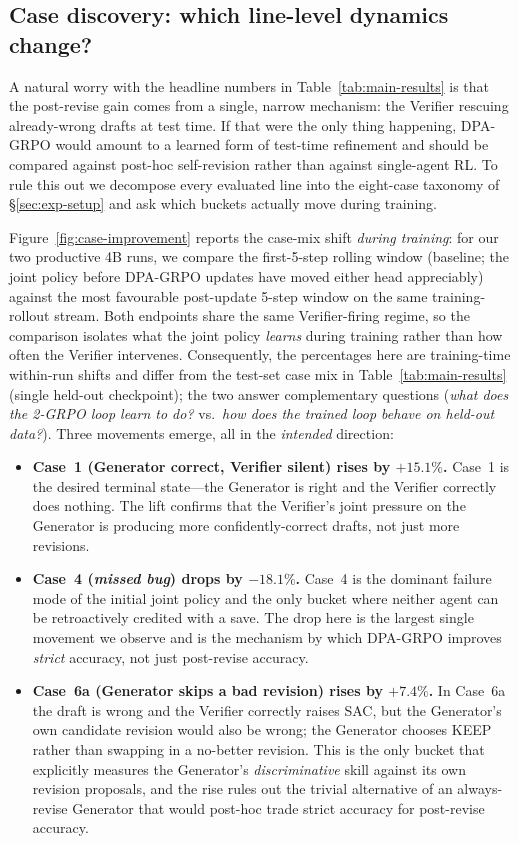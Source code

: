 \subsection{Case discovery: which line-level dynamics change?}
\label{sec:exp-cases}

A natural worry with the headline numbers in
Table~\ref{tab:main-results} is that the post-revise gain comes from a
single, narrow mechanism: the Verifier rescuing already-wrong drafts at
test time. If that were the only thing happening, DPA-GRPO would amount
to a learned form of test-time refinement and should be compared
against post-hoc self-revision rather than against single-agent RL. To
rule this out we decompose every evaluated line into the eight-case
taxonomy of \S\ref{sec:exp-setup} and ask which buckets actually move
during training.

Figure~\ref{fig:case-improvement} reports the case-mix shift
\emph{during training}: for our two productive 4B runs, we compare the
first-5-step rolling window (baseline; the joint policy before
DPA-GRPO updates have moved either head appreciably) against the most
favourable post-update 5-step window on the same training-rollout
stream. Both endpoints share the same Verifier-firing regime, so the
comparison isolates what the joint policy \emph{learns} during training
rather than how often the Verifier intervenes. Consequently, the
percentages here are training-time within-run shifts and differ from
the test-set case mix in Table~\ref{tab:main-results} (single held-out
checkpoint); the two answer complementary questions
(\emph{what does the 2-GRPO loop learn to do?} vs.\ \emph{how does the
trained loop behave on held-out data?}). Three movements emerge, all
in the \emph{intended} direction:

\begin{itemize}
\item \textbf{Case~1 (Generator correct, Verifier silent) rises by
  $+15.1\%$.} Case~1 is the desired terminal state---the Generator
  is right and the Verifier correctly does nothing. The lift confirms
  that the Verifier's joint pressure on the Generator is producing
  more confidently-correct drafts, not just more revisions.
\item \textbf{Case~4 (\emph{missed bug}) drops by $-18.1\%$.} Case~4
  is the dominant failure mode of the initial joint policy and the only
  bucket where neither agent can be retroactively credited with a save.
  The drop here is the largest single movement we observe and is the
  mechanism by which DPA-GRPO improves \emph{strict} accuracy, not just
  post-revise accuracy.
\item \textbf{Case~6a (Generator skips a bad revision) rises by
  $+7.4\%$.} In Case~6a the draft is wrong and the Verifier correctly
  raises SAC, but the Generator's own candidate revision would also be
  wrong; the Generator chooses KEEP rather than swapping in a
  no-better revision. This is the only bucket that explicitly
  measures the Generator's \emph{discriminative} skill against its
  own revision proposals, and the rise rules out the trivial
  alternative of an always-revise Generator that would post-hoc trade
  strict accuracy for post-revise accuracy.
\end{itemize}

